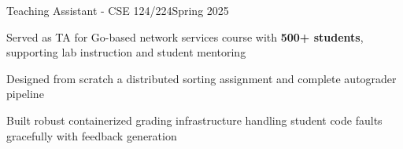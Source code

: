 \begin{joblong}{Teaching Assistant - CSE 124/224}{Spring 2025}
	\item Served as TA for Go-based network services course with \textbf{500+ students}, supporting lab instruction and student mentoring
	\item Designed from scratch a distributed sorting assignment and complete autograder pipeline
	\item Built robust containerized grading infrastructure handling student code faults gracefully with feedback generation
\end{joblong}
